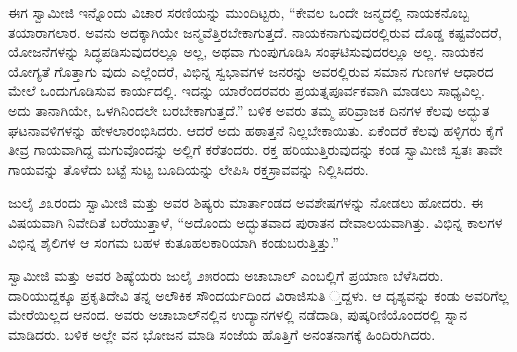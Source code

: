 ಈಗ ಸ್ವಾಮೀಜಿ ಇನ್ನೊಂದು ವಿಚಾರ ಸರಣಿಯನ್ನು ಮುಂದಿಟ್ಟರು, “ಕೇವಲ ಒಂದೇ ಜನ್ಮದಲ್ಲಿ ನಾಯಕನೊಬ್ಬ ತಯಾರಾಗಲಾರ. ಅವನು ಅದಕ್ಕಾಗಿಯೇ ಜನ್ಮವೆತ್ತಿರಬೇಕಾಗುತ್ತದೆ. ನಾಯಕನಾಗುವುದರಲ್ಲಿರುವ ದೊಡ್ಡ ಕಷ್ಟವೆಂದರೆ, ಯೋಜನೆಗಳನ್ನು ಸಿದ್ಧಪಡಿಸುವುದರಲ್ಲೂ ಅಲ್ಲ, ಅಥವಾ ಗುಂಪುಗೂಡಿಸಿ ಸಂಘಟಿಸುವುದರಲ್ಲೂ ಅಲ್ಲ. ನಾಯಕನ ಯೋಗ್ಯತೆ ಗೊತ್ತಾಗು ವುದು ಎಲ್ಲೆಂದರೆ, ವಿಭಿನ್ನ ಸ್ವಭಾವಗಳ ಜನರನ್ನು ಅವರಲ್ಲಿರುವ ಸಮಾನ ಗುಣಗಳ ಆಧಾರದ ಮೇಲೆ ಒಂದುಗೂಡಿಸುವ ಕಾರ್ಯದಲ್ಲಿ. ಇದನ್ನು ಯಾರೆಂದರವರು ಪ್ರಯತ್ನಪೂರ್ವಕವಾಗಿ ಮಾಡಲು ಸಾಧ್ಯವಿಲ್ಲ. ಅದು ತಾನಾಗಿಯೇ, ಒಳಗಿನಿಂದಲೇ ಬರಬೇಕಾಗುತ್ತದೆ.” ಬಳಿಕ ಅವರು ತಮ್ಮ ಪರಿವ್ರಾಜಕ ದಿನಗಳ ಕೆಲವು ಅದ್ಭುತ ಘಟನಾವಳಿಗಳನ್ನು ಹೇಳಲಾರಂಭಿಸಿದರು. ಆದರೆ ಅದು ಹಠಾತ್ತನೆ ನಿಲ್ಲಬೇಕಾಯಿತು. ಏಕೆಂದರೆ ಕೆಲವು ಹಳ್ಳಿಗರು ಕೈಗೆ ತೀವ್ರ ಗಾಯವಾಗಿದ್ದ ಮಗುವೊಂದನ್ನು ಅಲ್ಲಿಗೆ ಕರೆತಂದರು. ರಕ್ತ ಹರಿಯುತ್ತಿರುವುದನ್ನು ಕಂಡ ಸ್ವಾಮೀಜಿ ಸ್ವತಃ ತಾವೇ ಗಾಯವನ್ನು ತೊಳೆದು ಬಟ್ಟೆ ಸುಟ್ಟ ಬೂದಿಯನ್ನು ಲೇಪಿಸಿ ರಕ್ತಸ್ರಾವವನ್ನು ನಿಲ್ಲಿಸಿದರು.

ಜುಲೈ ೨೩ರಂದು ಸ್ವಾಮೀಜಿ ಮತ್ತು ಅವರ ಶಿಷ್ಯರು ಮಾರ್ತಾಂಡದ ಅವಶೇಷಗಳನ್ನು ನೋಡಲು ಹೋದರು. ಈ ವಿಷಯವಾಗಿ ನಿವೇದಿತೆ ಬರೆಯುತ್ತಾಳೆ, “ಅದೊಂದು ಅದ್ಭುತವಾದ ಪುರಾತನ ದೇವಾಲಯವಾಗಿತ್ತು. ವಿಭಿನ್ನ ಕಾಲಗಳ ವಿಭಿನ್ನ ಶೈಲಿಗಳ ಆ ಸಂಗಮ ಬಹಳ ಕುತೂಹಲಕಾರಿಯಾಗಿ ಕಂಡುಬರುತ್ತಿತ್ತು.”

ಸ್ವಾಮೀಜಿ ಮತ್ತು ಅವರ ಶಿಷ್ಯೆಯರು ಜುಲೈ ೨೫ರಂದು ಅಚಾಬಾಲ್ ಎಂಬಲ್ಲಿಗೆ ಪ್ರಯಾಣ ಬೆಳೆಸಿದರು. ದಾರಿಯುದ್ದಕ್ಕೂ ಪ್ರಕೃತಿದೇವಿ ತನ್ನ ಅಲೌಕಿಕ ಸೌಂದರ್ಯದಿಂದ ವಿರಾಜಿಸುತಿ ್ತದ್ದಳು. ಆ ದೃಶ್ಯವನ್ನು ಕಂಡು ಅವರಿಗೆಲ್ಲ ಮೇರೆಯಿಲ್ಲದ ಆನಂದ. ಅವರು ಅಚಾಬಾಲ್​ನಲ್ಲಿನ ಉದ್ಯಾನಗಳಲ್ಲಿ ನಡೆದಾಡಿ, ಪುಷ್ಕರಿಣಿಯೊಂದರಲ್ಲಿ ಸ್ನಾನ ಮಾಡಿದರು. ಬಳಿಕ ಅಲ್ಲೇ ವನ ಭೋಜನ ಮಾಡಿ ಸಂಜೆಯ ಹೊತ್ತಿಗೆ ಅನಂತನಾಗಕ್ಕೆ ಹಿಂದಿರುಗಿದರು.

